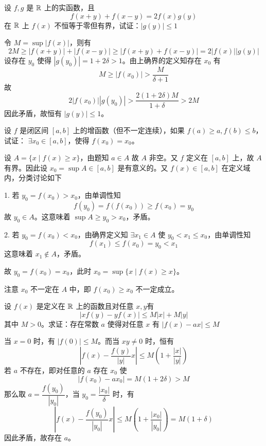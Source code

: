 \begin{problem}[000004]
设 $f,g$ 是 $\mathbb{R}$ 上的实函数，且
$$f(x+y)+f(x-y) = 2f(x)g(y)$$
在 $\mathbb{R}$ 上 $f(x)$ 不恒等于零但有界，试证：$|g(y)|\leqslant 1$
\end{problem}
\begin{solution}
	令 $M=\sup|f(x)|$，则有
	$$2M\geqslant |f(x+y)|+|f(x-y)| \geqslant |f(x+y)+f(x-y)| = 2|f(x)||g(y)|$$
	设存在 $y_0$ 使得 $|g(y_0)|=1+2\delta>1$。由上确界的定义知存在 $x_0$ 有
	$$M \geqslant |f(x_0)| > \frac{M}{\delta+1}$$
	故
	$$2|f(x_0)||g(y_0)| > \frac{2(1+2\delta)M}{1+\delta} > 2M$$
	因此矛盾，故恒有 $|g(y)|\leqslant 1$。
\end{solution}


\begin{problem}[000005]
设 $f$ 是闭区间 $[a,b]$ 上的增函数（但不一定连续），如果 $f(a) \geqslant a,f(b) \leqslant b$，试证： $\exists x_0 \in [a,b]$，使得 $f(x_0) = x_0$。
\end{problem}
\begin{solution}
	设 $A=\{x \mid f(x) \geqslant x\}$，由题知 $a\in A$ 故 $A$ 非空。又 $f$ 定义在 $[a,b]$ 上，故 $A$ 有界。因此设 $x_0=\sup A\in [a,b]$ 是有意义的。又 $f(x)\in[a,b]$ 在定义域内，分类讨论如下

	1. 若 $y_0=f(x_0) > x_0$，由单调性知
	$$f(y_0)=f(f(x_0)) \geqslant f(x_0) = y_0$$
	故 $y_0\in A$。这意味着 $\sup A \geqslant y_0 >x_0$，矛盾。

	2. 若 $y_0=f(x_0) < x_0$，由确界定义知 $\exists x_1\in A$ 使 $y_0<x_1\leqslant x_0$，由单调性知
	$$f(x_1)\leqslant f(x_0)=y_0 <x_1$$
	这意味着 $x_1\notin A$，矛盾。

	故 $y_0=f(x_0)=x_0$，此时 $x_0 = \sup\{x \mid f(x) \geqslant x\}$。

	注意 $x_0$ 不一定在 $A$ 中，即 $f(x_0) \geqslant x_0$ 不一定成立。
\end{solution}


\begin{problem}[000006]
设 $f(x)$ 是定义在 $\mathbb{R}$ 上的函数且对任意 $x,y$有
$$|xf(y)-yf(x)| \leqslant M|x|+M|y|$$
其中 $M > 0$。求证：存在常数 $a$ 使得对任意 $x$ 有 $|f(x)-ax| \leqslant M$
\end{problem}
\begin{solution}
	当 $x=0$ 时，有 $|f(0)|\leqslant M$。而当 $xy\ne 0$ 时，恒有
	$$\left| f(x)-\frac{f(y)}{|y|}x \right| \leqslant M \left(1+\frac{|x|}{|y|}\right)$$
	若 $a$ 不存在，即对任意的 $a$ 存在 $x_0$ 使
	$$|f(x_0)-ax_0|=M(1+2\delta)>M$$
	那么取 $a = \dfrac{f(y_0)}{|y_0|}$，当 $y_0=\dfrac{|x_0|}{\delta}$ 时，有
	$$\left| f(x)-\frac{f(y_0)}{|y_0|}x \right| \leqslant M \left(1+ \frac{|x_0|}{|y_0|}\right)=M(1+\delta)$$
	因此矛盾，故存在 $a$。
\end{solution}

